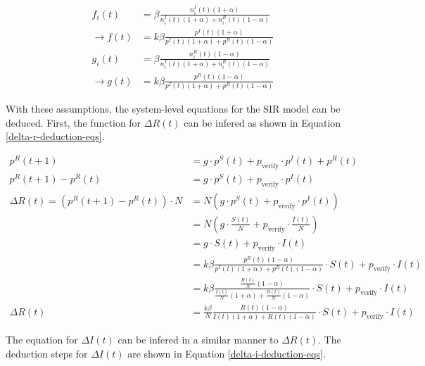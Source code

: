 \begin{subequations}
\begin{align}
    f_i(t) &= \beta \frac{n_i^I(t)(1+\alpha)}{n_i^I(t)(1+\alpha)+n_i^R(t)(1-\alpha)} 
    \nonumber\\
    \to f(t) &= k\beta \frac{p^I(t)(1+\alpha)}{p^I(t)(1+\alpha)+p^R(t)(1-\alpha)}
    \label{generalized-function-f} \\
    g_i(t) &= \beta \frac{n_i^R(t)(1-\alpha)}{n_i^I(t)(1+\alpha)+n_i^R(t)(1-\alpha)} 
    \nonumber \\
    \to g(t) &= k\beta \frac{p^R(t)(1-\alpha)}{p^I(t)(1+\alpha)+p^R(t)(1-\alpha)}
    \label{generalized-function-g}
\end{align}
\label{generalized-functions-g-f}
\end{subequations}

With these assumptions, the system-level equations for the SIR model can 
be deduced. First, the function for $\Delta R(t)$ can be infered
as shown in Equation \ref{delta-r-deduction-eqs}.

\begin{align}
    p^R(t+1) &= g \cdot p^S(t) + p_{\mathrm{verify}}\cdot p^I(t) + p^R(t) \nonumber\\
    p^R(t+1) - p^R(t) &= g \cdot p^S(t) + p_{\mathrm{verify}}\cdot p^I(t) \nonumber\\
    \Delta R(t) = (p^R(t+1) - p^R(t))\cdot N 
    &= N(g \cdot p^S(t) + p_{\mathrm{verify}}\cdot p^I(t)) \nonumber\\
    &= N(g \cdot \frac{S(t)}{N} + p_{\mathrm{verify}}\cdot \frac{I(t)}{N} ) \nonumber\\
    &= g \cdot S(t) + p_{\mathrm{verify}}\cdot I(t) \nonumber\\
    &= k\beta \frac{p^R(t)(1-\alpha)}{p^I(t)(1+\alpha)+p^R(t)(1-\alpha)} 
    \cdot S(t) + p_{\mathrm{verify}}\cdot I(t) \nonumber\\
    &= k\beta \frac{\frac{R(t)}{N}(1-\alpha)}{\frac{I(t)}{N}(1+\alpha)+\frac{R(t)}{N}(1-\alpha)} 
    \cdot S(t) + p_{\mathrm{verify}}\cdot I(t) \nonumber\\
    \Delta R(t) &= \frac{k\beta}{N} \frac{R(t)(1-\alpha)}{I(t)(1+\alpha)+R(t)(1-\alpha)} 
    \cdot S(t) + p_{\mathrm{verify}}\cdot I(t) \label{delta-r-deduction-eqs}
\end{align}

The equation for $\Delta I(t)$ can be infered in a similar manner to $\Delta R(t)$.
The deduction steps for $\Delta I(t)$ are shown in Equation 
\ref{delta-i-deduction-eqs}.

